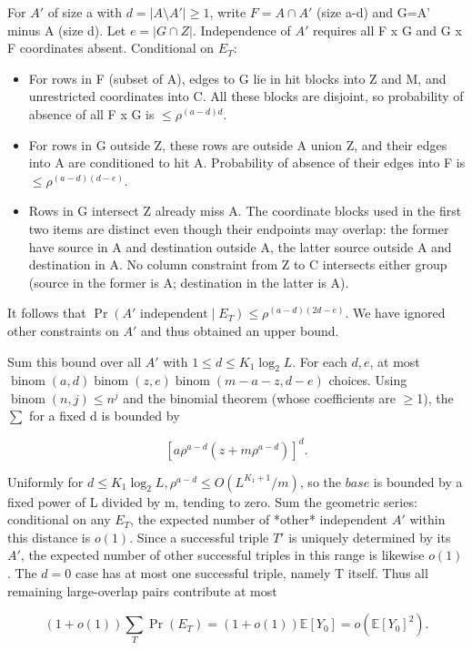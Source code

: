 \documentclass[11pt]{article}
\begin{document}
For $A'$ of size a with $d=|A \setminus  A'|\geq 1$, write $F=A \cap  A'$ (size a-d) and G=A' minus A (size d). Let $e=|G \cap  Z|$. Independence of $A'$ requires all F x G and G x F coordinates absent. Conditional on $E_{T}$:

\begin{itemize}
\item For rows in F (subset of A), edges to G lie in hit blocks into Z and M, and unrestricted coordinates into C. All these blocks are disjoint, so probability of absence of all F x G is $\leq \rho ^{(a-d)d}$.
\item For rows in G outside Z, these rows are outside A union Z, and their edges into A are conditioned to hit A. Probability of absence of their edges into F is $\leq \rho ^{(a-d)(d-e)}$.
\item Rows in G intersect Z already miss A. The coordinate blocks used in the first two items are distinct even though their endpoints may overlap: the former have source in A and destination outside A, the latter source outside A and destination in A. No column constraint from Z to C intersects either group (source in the former is A; destination in the latter is A).
\end{itemize}

It follows that $\Pr(A'\text{ independent}\mid E_T)\leq\rho^{(a-d)(2d-e)}$. We have ignored other constraints on $A'$ and thus obtained an upper bound.

Sum this bound over all $A'$ with $1\leq d\leq K_{1} \log _{2} L$. For each $d,e$, at most $\operatorname{binom}(a,d)\operatorname{binom}(z,e)\operatorname{binom}(m-a-z,d-e)$ choices. Using $\operatorname{binom}(n,j)\leq n^{j}$ and the binomial theorem (whose coefficients are \ensuremath{\geq}1), the $\sum $ for a fixed d is bounded by

\[
\left[a\rho^{a-d}(z+m\rho^{a-d})\right]^d.
\]

Uniformly for $d\leq K_{1} \log _{2} L, \rho ^{a-d}\leq O(L^{K_{1}+1}/m)$, so the $base$ is bounded by a fixed power of L divided by m, tending to zero. Sum the geometric series: conditional on any $E_{T}$, the expected number of *other* independent $A'$ within this distance is $o(1)$. Since a successful triple $T'$ is uniquely determined by its $A'$, the expected number of other successful triples in this range is likewise $o(1)$. The $d=0$ case has at most one successful triple, namely T itself. Thus all remaining large-overlap pairs contribute at most

\[
(1+o(1))\sum_T\Pr(E_T)=(1+o(1))\mathbb E[Y_0]=o(\mathbb E[Y_0]^2).
\]
\end{document}
